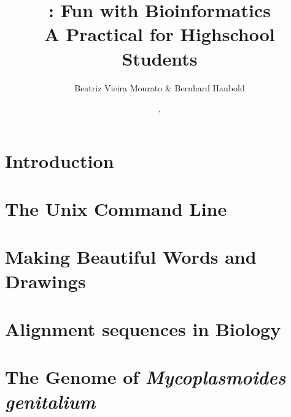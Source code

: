 \documentclass[a4paper]{report}
\begin{document}
\pagestyle{noweb}

\title{:  Fun with Bioinformatics\\\small A Practical for
  Highschool Students\\\scriptsize {}}
\author{Beatriz Vieira Mourato \& Bernhard Haubold}
\date{\hspace{-3pt}, }
\maketitle

\tableofcontents

\chapter{Introduction}\label{ch:intro}

\chapter{The Unix Command Line}\label{ch:unix}

\chapter{Making Beautiful Words and Drawings}\label{ch:latex}

\chapter{Alignment sequences in Biology}\label{ch:al}

\chapter{The Genome of \emph{Mycoplasmoides genitalium}}\label{ch:genome}



\end{document}
